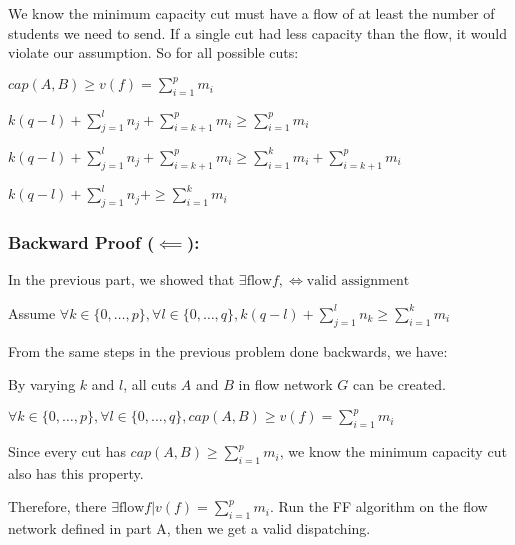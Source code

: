 We know the minimum capacity cut must have a flow of at least the number of students we need to send. If a single cut had less capacity than the flow, it would violate our assumption. So for all possible cuts:

$cap(A,B) \geq v(f) = \sum_{i=1}^{p} m_i$

$k(q-l) + \sum_{j=1}^{l}n_j + \sum_{i=k+1}^{p} m_i \geq \sum_{i=1}^{p} m_i$

$k(q-l) + \sum_{j=1}^{l}n_j + \sum_{i=k+1}^{p} m_i \geq \sum_{i=1}^{k} m_i + \sum_{i=k+1}^{p} m_i$

$k(q-l) + \sum_{j=1}^{l}n_j +\geq \sum_{i=1}^{k} m_i$

\subsubsection*{Backward Proof ($\impliedby$):}
In the previous part, we showed that $\exists \text{flow} f, \iff \text{valid assignment}$

Assume $\forall k \in \{0, \dots, p\}, \forall l \in \{0, \dots, q\}, k(q-l) + \sum_{j=1}^{l} n_k \geq \sum_{i=1}^{k} m_i$

From the same steps in the previous problem done backwards, we have:

By varying $k$ and $l$, all cuts $A$ and $B$ in flow network $G$ can be created.

$\forall k \in \{0, \dots, p\}, \forall l \in \{0, \dots, q\}, cap(A,B) \geq v(f) = \sum_{i=1}^{p} m_i$

Since every cut has $cap(A,B) \geq \sum_{i=1}^{p} m_i$, we know the minimum capacity cut also has this property.

Therefore, there $\exists \text{flow} f | v(f) = \sum_{i=1}^{p} m_i$. Run the FF algorithm on the flow network defined in part A, then we get a valid dispatching.
